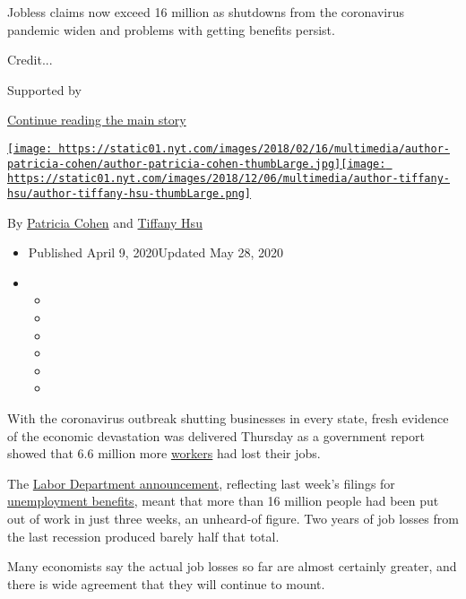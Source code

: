 Jobless claims now exceed 16 million as shutdowns from the coronavirus
pandemic widen and problems with getting benefits persist.

Credit...

Supported by

\protect\hyperlink{after-sponsor}{Continue reading the main story}

\href{https://www.nytimes.com/by/patricia-cohen}{\texttt{[image: https://static01.nyt.com/images/2018/02/16/multimedia/author-patricia-cohen/author-patricia-cohen-thumbLarge.jpg]}}\href{https://www.nytimes.com/by/tiffany-hsu}{\texttt{[image: https://static01.nyt.com/images/2018/12/06/multimedia/author-tiffany-hsu/author-tiffany-hsu-thumbLarge.png]}}

By \href{https://www.nytimes.com/by/patricia-cohen}{Patricia Cohen} and
\href{https://www.nytimes.com/by/tiffany-hsu}{Tiffany Hsu}

\begin{itemize}
\item
  Published April 9, 2020Updated May 28, 2020
\item
  \begin{itemize}
  \item
  \item
  \item
  \item
  \item
  \item
  \end{itemize}
\end{itemize}

With the coronavirus outbreak shutting businesses in every state, fresh
evidence of the economic devastation was delivered Thursday as a
government report showed that 6.6 million more
\href{https://www.nytimes.com/article/self-employed-workers-unemployment-coronavirus-stimulus-package.html}{workers}
had lost their jobs.

The \href{https://www.dol.gov/ui/data.pdf}{Labor Department
announcement}, reflecting last week's filings for
\href{https://www.nytimes.com/2020/07/23/business/economy/unemployment-benefits.html}{unemployment
benefits}, meant that more than 16 million people had been put out of
work in just three weeks, an unheard-of figure. Two years of job losses
from the last recession produced barely half that total.

Many economists say the actual job losses so far are almost certainly
greater, and there is wide agreement that they will continue to mount.

